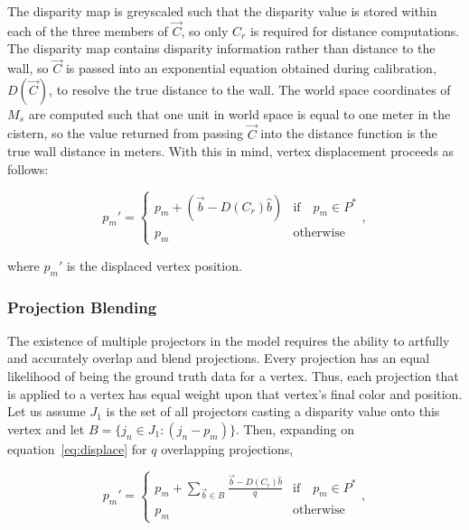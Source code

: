 \documentclass[twocolumn]{article}
\begin{document}
The disparity map is greyscaled such that the disparity value is stored within each of the three members of $\vec{C}$, so only $C_r$ is required for distance computations. The disparity map contains disparity information rather than distance to the wall, so $\vec{C}$ is passed into an exponential equation obtained during calibration, $D(\vec{C})$, to resolve the true distance to the wall. The world space coordinates of $M_s$ are computed such that one unit in world space is equal to one meter in the cistern, so the value returned from passing $\vec{C}$ into the distance function is the true wall distance in meters. With this in mind, vertex displacement proceeds as follows:

\begin{equation}
p_{m}' = \left \{ 
\begin{array}{ll}
p_{m} + (\vec{b} - D(C_r)\hat{b})  & \text{if} \quad p_{m} \in P^{*}\\
p_{m} & \text{otherwise}
\end{array},\right.
\label{eq:displace}
\end{equation}

where $p_{m}'$ is the displaced vertex position.
 
 \subsubsection{Projection Blending}

The existence of multiple projectors in the model requires the ability to artfully and accurately overlap and blend projections. Every projection has an equal likelihood of being the ground truth data for a vertex. Thus, each projection that is applied to a vertex has equal weight upon that vertex's final color and position. Let us assume $J_1$ is the set of all projectors casting a disparity value onto this vertex and let $B = \{j_n \in J_1 : (j_n - p_m)\}$. 
Then, expanding on equation~\ref{eq:displace} for $q$ overlapping projections,

\begin{equation}
p_{m}' = \left \{ 
\begin{array}{ll}
p_{m} + \sum\limits_{\vec{b} \in B} \frac{\vec{b} - D(C_r)\hat{b}}{q} & \text{if} \quad p_{m} \in P^{*}\\
p_{m} & \text{otherwise}
\end{array},\right.
\label{eq:displaceBlend}
\end{equation}
\end{document}
